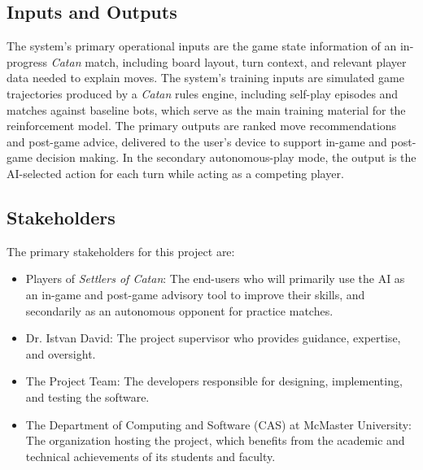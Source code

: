 \documentclass{article}
\begin{document}

\subsection{Inputs and Outputs}\label{subsec:inputs-and-outputs}
The system's primary operational inputs are the game state information of an in-progress \emph{Catan} match, 
including board layout, turn context, and relevant player data needed to explain moves.
The system's training inputs are simulated game trajectories produced by a \emph{Catan} rules engine, including 
self-play episodes and matches against baseline bots, which serve as the main training material for the reinforcement model.
The primary outputs are ranked move recommendations and post-game advice, delivered to the user's device to support in-game 
and post-game decision making.
In the secondary autonomous-play mode, the output is the AI-selected action for each turn while acting as a competing 
player.

\subsection{Stakeholders}\label{subsec:stakeholders}
The primary stakeholders for this project are:
\begin{itemize}
    \item Players of \emph{Settlers of Catan}: The end-users who will primarily use the AI as an in-game and post-game advisory tool to improve their skills, and secondarily as an autonomous opponent for practice matches.
    \item Dr. Istvan David: The project supervisor who provides guidance, expertise, and oversight.
    \item The Project Team: The developers responsible for designing, implementing, and testing the software.
    \item The Department of Computing and Software (CAS) at McMaster University: The organization hosting the project, which benefits from the academic and technical achievements of its students and faculty.
\end{itemize}
\end{document}
